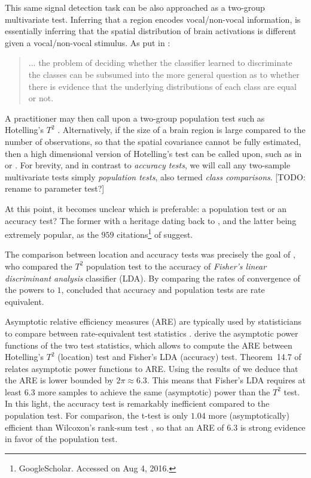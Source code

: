 \documentclass[12pt,a4paper]{article}
\theoremstyle{definition}
\begin{document}
This same signal detection task can be also approached as a two-group multivariate test.
Inferring that a region encodes vocal/non-vocal information, is essentially inferring that the spatial distribution of brain activations is different given a vocal/non-vocal stimulus. 
As put in \cite{pereira_machine_2009}: 
\begin{quote}
... the problem of deciding whether the classifier learned to discriminate the classes can be subsumed into the more general question as to whether there is evidence that the underlying distributions of each class are equal or not.
\end{quote}
A practitioner may then call upon a two-group population test such as Hotelling's $T^2$ \citep{anderson_introduction_2003}.
Alternatively, if the size of a brain region is large compared to the number of observations, so that the spatial covariance cannot be fully estimated, then a high dimensional version of Hotelling's test can be called upon, such as in \cite{schafer_shrinkage_2005} or \cite{srivastava_multivariate_2007}.
For brevity, and in contrast to \emph{accuracy tests}, we will call any two-sample multivariate tests simply \emph{population tests}, also termed \emph{class comparisons}. [TODO: rename to parameter test?]


At this point, it becomes unclear which is preferable: a population test or an accuracy test?
The former with a heritage dating back to \cite{hotelling_generalization_1931}, and the latter being extremely popular, as the $959$ citations\footnote{GoogleScholar. Accessed on Aug 4, 2016.} of \cite{kriegeskorte_information-based_2006} suggest. 

The comparison between location and accuracy tests was precisely the goal of \cite{ramdas_classification_2016}, who compared the $T^2$ population test to the accuracy of \emph{Fisher's linear discriminant analysis} classifier (LDA). 
By comparing the rates of convergence of the powers to $1$, \cite{ramdas_classification_2016} concluded that accuracy and population tests are rate equivalent. 

Asymptotic relative efficiency measures (ARE) are typically used by statisticians to compare between rate-equivalent test statistics \citep{vaart_asymptotic_1998}.
\cite{ramdas_classification_2016} derive the asymptotic power functions of the two test statistics, which allows to compute the ARE between Hotelling's $T^2$ (location) test and Fisher's LDA (accuracy) test.
Theorem~14.7 of \cite{vaart_asymptotic_1998} relates asymptotic power functions to ARE.
Using the results of \cite{ramdas_classification_2016} we deduce that the ARE is lower bounded by $2 \pi \approx 6.3$. 
This means that Fisher's LDA requires at least $6.3$ more samples to achieve the same (asymptotic) power than the $T^2$ test. 
In this light, the accuracy test is remarkably inefficient compared to the population test.  
For comparison, the t-test is only $1.04$ more (asymptotically) efficient than Wilcoxon's rank-sum test \citep{lehmann_parametric_2009}, so that an ARE of $6.3$ is strong evidence in favor of the population test. 
\end{document}
